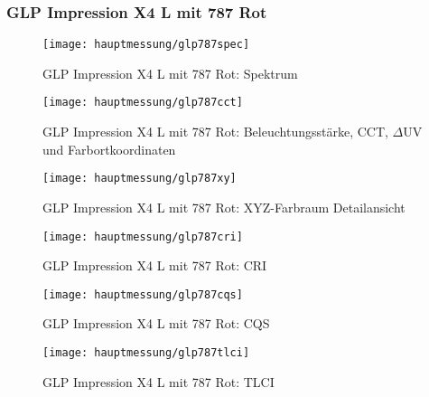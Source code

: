 \documentclass[pagesize,paper=A4,fontsize=12pt,utf8,numbers=noenddot,bibliography=totoc,listof=totoc,DIV=11,BCOR=1mm]{scrreprt}
\begin{document}
\subsubsection{GLP Impression X4 L mit 787 Rot}

\begin{figure}[htp]     %
\centering
\texttt{[image: hauptmessung/glp787spec]} 
\caption {GLP Impression X4 L mit 787 Rot: Spektrum} 
\end{figure}

\begin{figure}[htp]     %
\centering
\texttt{[image: hauptmessung/glp787cct]} 
\caption {GLP Impression X4 L mit 787 Rot: Beleuchtungsstärke, CCT, $\Delta$UV und Farbortkoordinaten} 
\end{figure}

\begin{figure}[htp]     %
\centering
\texttt{[image: hauptmessung/glp787xy]} 
\caption {GLP Impression X4 L mit 787 Rot: XYZ-Farbraum Detailansicht} 
\end{figure}

\begin{figure}[htp]     %
\centering
\texttt{[image: hauptmessung/glp787cri]} 
\caption {GLP Impression X4 L mit 787 Rot: CRI} 
\end{figure}

\begin{figure}[htp]     %
\centering
\texttt{[image: hauptmessung/glp787cqs]} 
\caption {GLP Impression X4 L mit 787 Rot: CQS} 
\end{figure}

\begin{figure}[htp]     %
\centering
\texttt{[image: hauptmessung/glp787tlci]} 
\caption {GLP Impression X4 L mit 787 Rot: TLCI} 
\end{figure}
\end{document}
